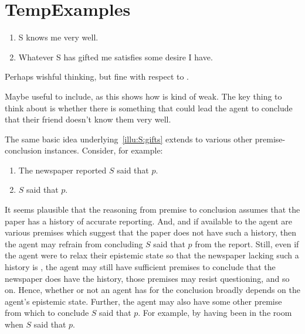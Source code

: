 \chapter{TempExamples}
\label{cha:tempexamples}

\begin{note}[Gifts]
  \begin{illustration}
    \label{illu:S:gifts}
    \begin{enumerate}
    \item S knows me very well.
    \item Whatever S has gifted me satisfies some desire I have.
    \end{enumerate}
  \end{illustration}
  Perhaps wishful thinking, but fine with respect to \zS{}.

  {
    \color{red}
    Maybe useful to include, as this shows how \zS{} is kind of weak.
    The key thing to think about is whether there is something that could lead the agent to conclude that their friend doesn't know them very well.
  }

  The same basic idea underlying~\autoref{illu:S:gifts} extends to various other premise-conclusion instances.
  Consider, for example:

  \begin{enumerate}
  \item The newspaper reported \(S\) said that \(p\).
  \item \(S\) said that \(p\).
  \end{enumerate}

  It seems plausible that the reasoning from premise to conclusion assumes that the paper has a history of accurate reporting.
  And, and if available to the agent are various premises which suggest that the paper does not have such a history, then the agent may refrain from concluding \(S\) said that \(p\) from the report.
  Still, even if the agent were to relax their epistemic state so that the newspaper lacking such a history is \epVAd{}, the agent may still have sufficient premises to conclude that the newspaper does have the history, those premises may resist questioning, and so on.
  Hence, whether or not an agent has \support{} for the conclusion broadly depends on the agent's epistemic state.
  Further, the agent may also have some other premise from which to conclude \(S\) said that \(p\).
  For example, by having been in the room when \(S\) said that \(p\).
\end{note}

